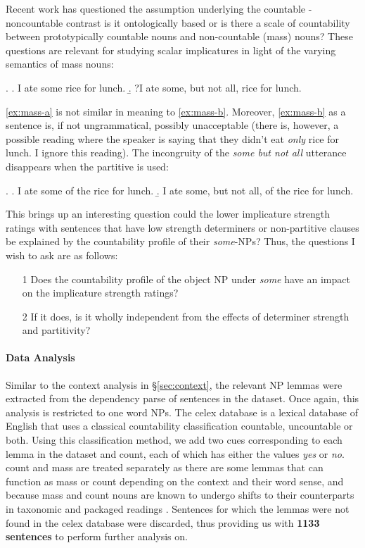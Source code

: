\documentclass[10pt, biblatex, linguex]{report}
\begin{document}
Recent work has questioned the assumption underlying the countable - noncountable
contrast \citep{grimm2020, grimmgrammatical2018} \dash is it ontologically based
or is there a scale of countability between prototypically countable nouns and
non-countable (mass) nouns? These questions are relevant for studying scalar
implicatures in light of the varying semantics of mass nouns:

\ex. \a. I ate some rice for lunch.\label{ex:mass-a}
     \b. ?I ate some, but not all, rice for lunch.\label{ex:mass-b}

\ref{ex:mass-a} is not similar in meaning to \ref{ex:mass-b}. Moreover,
\ref{ex:mass-b} as a sentence is, if not ungrammatical, possibly unacceptable
(there is, however, a possible reading where the speaker is saying that they
didn't eat \textit{only} rice for lunch. I ignore this reading). The incongruity
of the \textit{some but not all} utterance disappears when the
partitive is used:

\ex. \a. I ate some of the rice for lunch.\label{ex:mass-p-a}
     \b. I ate some, but not all, of the rice for lunch. \label{ex:mass-p-b}

This brings up an interesting question \dash could the lower
implicature strength ratings with sentences that have low strength determiners or
non-partitive clauses be explained by the countability profile of their
\textit{some}-NPs? Thus, the questions I wish to ask are as follows:

\begin{enumerate}
    \item[1] Does the countability profile of the object NP under \textit{some}
          have an impact on the implicature strength ratings?
    \item[2] If it does, is it wholly independent from the effects of determiner strength and
          partitivity?
\end{enumerate}


\paragraph{Data Analysis} Similar to the context analysis in \S \ref{sec:context},
the relevant NP lemmas were extracted from the dependency parse of sentences in
the dataset. Once again, this analysis is restricted to one word NPs. The
{\rmsc celex} database \citep{celex2} is a lexical database of English that
uses a classical countability classification \dash countable, uncountable or both.
Using this classification method, we add two cues
corresponding to each lemma in the dataset  and
{\rmsc count}, each of which has either the values \textit{yes} or \textit{no}.
{\rmsc count} and {\rmsc mass} are treated separately as there are some lemmas
that can function as mass or count depending on the context and their word sense,
and because mass and count nouns are known to undergo shifts to their counterparts
in taxonomic and packaged readings \citep{moltmann2020}. Sentences for which the
lemmas were not found in the {\rmsc celex} database were discarded, thus providing us
with \textbf{1133 sentences} to perform further analysis on.
\end{document}
